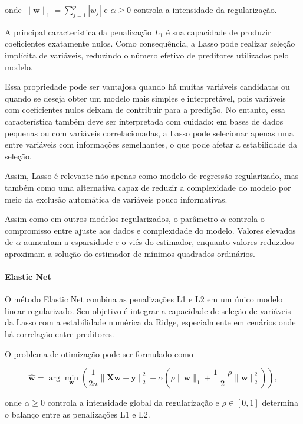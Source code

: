 onde
\(
\|\mathbf{w}\|_1 = \sum_{j=1}^{p} |w_j|
\)
e \(\alpha \ge 0\) controla a intensidade da regularização.

A principal característica da penalização \(L_1\) é sua capacidade de produzir coeficientes exatamente nulos. Como consequência, a Lasso pode realizar seleção implícita de variáveis, reduzindo o número efetivo de preditores utilizados pelo modelo.

Essa propriedade pode ser vantajosa quando há muitas variáveis candidatas ou quando se deseja obter um modelo mais simples e interpretável, pois variáveis com coeficientes nulos deixam de contribuir para a predição. No entanto, essa característica também deve ser interpretada com cuidado: em bases de dados pequenas ou com variáveis correlacionadas, a Lasso pode selecionar apenas uma entre variáveis com informações semelhantes, o que pode afetar a estabilidade da seleção.

Assim, Lasso é relevante não apenas como modelo de regressão regularizado, mas também como uma alternativa capaz de reduzir a complexidade do modelo por meio da exclusão automática de variáveis pouco informativas.

Assim como em outros modelos regularizados, o parâmetro \(\alpha\) controla o compromisso entre ajuste aos dados e complexidade do modelo. Valores elevados de \(\alpha\) aumentam a esparsidade e o viés do estimador, enquanto valores reduzidos aproximam a solução do estimador de mínimos quadrados ordinários.

\paragraph{Elastic Net}

O método Elastic Net combina as penalizações L1 e L2 em um único modelo linear regularizado. Seu objetivo é integrar a capacidade de seleção de variáveis da Lasso com a estabilidade numérica da Ridge, especialmente em cenários onde há correlação entre preditores.

O problema de otimização pode ser formulado como

\begin{equation}
\hat{\mathbf{w}}
=
\arg\min_{\mathbf{w}}
\left(
\frac{1}{2n}
\|\mathbf{X}\mathbf{w} - \mathbf{y}\|_2^2
+
\alpha
\left(
\rho \|\mathbf{w}\|_1
+
\frac{1-\rho}{2}
\|\mathbf{w}\|_2^2
\right)
\right),
\end{equation}

onde \(\alpha \ge 0\) controla a intensidade global da regularização e
\(\rho \in [0,1]\) determina o balanço entre as penalizações L1 e L2.

